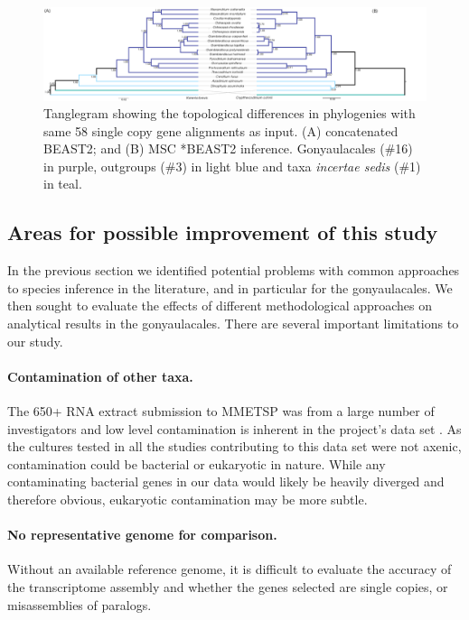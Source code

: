 \documentclass[fleqn,10pt,lineno]{wlpeerj} %
\begin{document}
\begin{figure}[ht]
\centering
\includegraphics[width=\linewidth]{gonya-figs/SC-MSC-BI-vs-SC-concat-BI.png} 
\caption{Tanglegram showing the topological differences in phylogenies with same 58 single copy gene alignments as input. (A) concatenated BEAST2; and (B) MSC *BEAST2 inference. Gonyaulacales (\#16) in purple, outgroups (\#3) in light blue and taxa \textit{incertae sedis} (\#1) in teal.} 
\label{fig:tangleconcatBI}
\end{figure} 



\subsection*{Areas for possible improvement of this study}
In the previous section we identified potential problems with common approaches to species inference in the literature, and in particular for the gonyaulacales. 
We then sought to evaluate the effects of different methodological approaches on analytical results in the gonyaulacales. 
There are several important limitations to our study. 
\paragraph*{Contamination of other taxa.} 
The 650+ RNA extract submission to MMETSP was from a large number of investigators and low level contamination is inherent in the project's data set \cite{keeling2014marine}. 
As the cultures tested in all the studies contributing to this data set were not axenic, contamination could be bacterial or eukaryotic in nature. 
While any contaminating bacterial genes in our data would likely be heavily diverged and therefore obvious, eukaryotic contamination may be more subtle.
\paragraph*{No representative genome for comparison.} 
Without an available reference genome, it is difficult to evaluate the accuracy of the transcriptome assembly and whether the genes selected are single copies, or misassemblies of paralogs.
\end{document}
